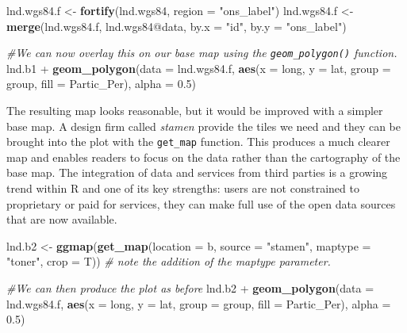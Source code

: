 \documentclass[]{article}
\newenvironment{Shaded}{}{}
\newcommand{\KeywordTok}[1]{\textcolor[rgb]{0.00,0.44,0.13}{\textbf{{#1}}}}
\newcommand{\DataTypeTok}[1]{\textcolor[rgb]{0.56,0.13,0.00}{{#1}}}
\newcommand{\FloatTok}[1]{\textcolor[rgb]{0.25,0.63,0.44}{{#1}}}
\newcommand{\StringTok}[1]{\textcolor[rgb]{0.25,0.44,0.63}{{#1}}}
\newcommand{\CommentTok}[1]{\textcolor[rgb]{0.38,0.63,0.69}{\textit{{#1}}}}
\newcommand{\NormalTok}[1]{{#1}}
\begin{document}
\begin{Shaded}
\begin{Highlighting}[]
\NormalTok{lnd.wgs84.f <- }\KeywordTok{fortify}\NormalTok{(lnd.wgs84, }\DataTypeTok{region =} \StringTok{"ons_label"}\NormalTok{)}
\NormalTok{lnd.wgs84.f <- }\KeywordTok{merge}\NormalTok{(lnd.wgs84.f, lnd.wgs84@data, }\DataTypeTok{by.x =} \StringTok{"id"}\NormalTok{, }\DataTypeTok{by.y =} \StringTok{"ons_label"}\NormalTok{)}
\end{Highlighting}
\end{Shaded}


\begin{Shaded}
\begin{Highlighting}[]
\CommentTok{#We can now overlay this on our base map using the
\texttt{geom\_polygon()} function.}
\NormalTok{lnd.b1 + }\KeywordTok{geom_polygon}\NormalTok{(}\DataTypeTok{data =} \NormalTok{lnd.wgs84.f, }\KeywordTok{aes}\NormalTok{(}\DataTypeTok{x =} \NormalTok{long, }\DataTypeTok{y =} \NormalTok{lat, }\DataTypeTok{group =} \NormalTok{group, }
    \DataTypeTok{fill =} \NormalTok{Partic_Per), }\DataTypeTok{alpha =} \FloatTok{0.5}\NormalTok{)}
\end{Highlighting}
\end{Shaded}
The resulting map looks reasonable, but it would be improved with a
simpler base map. A design firm called \emph{stamen}
provide the tiles we need and they can be brought into the plot with the
\texttt{get\_map} function. This produces a much clearer map and enables readers to focus on the data rather than the cartography of the base map. The integration of data and services from third parties is a growing trend within R and one of its key strengths: users are not constrained to proprietary or paid for services, they can make full use of the open data sources that are now available.

\begin{Shaded}
\begin{Highlighting}[]
\NormalTok{lnd.b2 <- }\KeywordTok{ggmap}\NormalTok{(}\KeywordTok{get_map}\NormalTok{(}\DataTypeTok{location =} \NormalTok{b, }\DataTypeTok{source =} \StringTok{"stamen"}\NormalTok{, }\DataTypeTok{maptype =} \StringTok{"toner"}\NormalTok{, }
    \DataTypeTok{crop =} \NormalTok{T))  }\CommentTok{# note the addition of the maptype parameter.}
\end{Highlighting}
\end{Shaded}

\begin{Shaded}
\begin{Highlighting}[]
\CommentTok{#We can then produce the plot as before}
\NormalTok{lnd.b2 + }\KeywordTok{geom_polygon}\NormalTok{(}\DataTypeTok{data =} \NormalTok{lnd.wgs84.f, }\KeywordTok{aes}\NormalTok{(}\DataTypeTok{x =} \NormalTok{long, }\DataTypeTok{y =} \NormalTok{lat, }\DataTypeTok{group =} \NormalTok{group, }
    \DataTypeTok{fill =} \NormalTok{Partic_Per), }\DataTypeTok{alpha =} \FloatTok{0.5}\NormalTok{)}
\end{Highlighting}
\end{Shaded}
\end{document}
